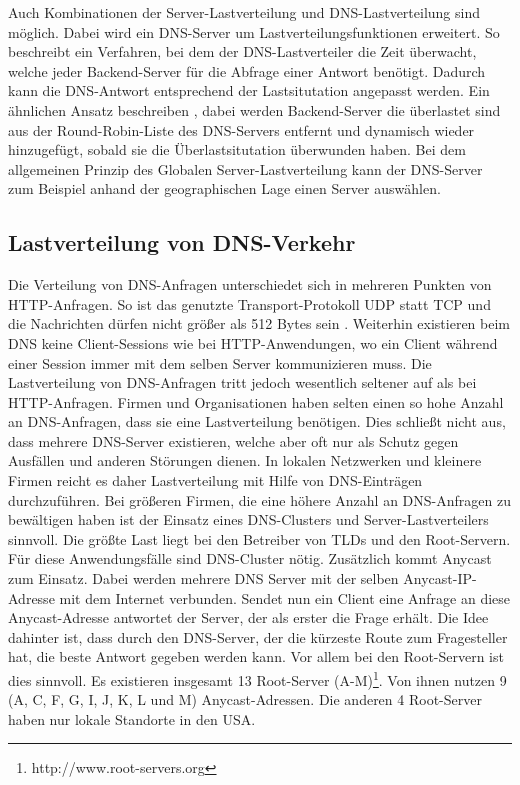 \documentclass[a4paper, 12pt, BCOR10mm, DIV12, toc=bibliography, toc=listof, german]{scrbook}
\begin{document}
			Auch Kombinationen der Server-Lastverteilung und DNS-Lastverteilung sind möglich. Dabei wird ein
			DNS-Server um Lastverteilungsfunktionen erweitert. So beschreibt \cite{chyuyi2003} ein
			Verfahren, bei dem der DNS-Lastverteiler die Zeit überwacht, welche jeder Backend-Server für
			die Abfrage einer Antwort benötigt. Dadurch kann die DNS-Antwort entsprechend der
			Lastsitutation angepasst werden. Ein ähnlichen Ansatz beschreiben \cite{mookim2005}, dabei
			werden Backend-Server die überlastet sind aus der Round-Robin-Liste des DNS-Servers entfernt
			und dynamisch wieder hinzugefügt, sobald sie die Überlastsitutation überwunden haben. Bei dem
			allgemeinen Prinzip des Globalen Server-Lastverteilung \cite{bourke2001} kann der DNS-Server
			zum Beispiel anhand der geographischen Lage einen Server auswählen.

			
			\subsection*{Lastverteilung von DNS-Verkehr} %

			Die Verteilung von DNS-Anfragen unterschiedet sich in mehreren Punkten von HTTP-Anfragen. So
			ist das genutzte Transport-Protokoll UDP statt TCP und die Nachrichten dürfen nicht größer als
			512 Bytes sein \cite{rfc1035}. Weiterhin existieren beim DNS keine Client-Sessions wie bei
			HTTP-Anwendungen, wo ein Client während einer Session immer mit dem selben Server
			kommunizieren muss. Die Lastverteilung von DNS-Anfragen tritt jedoch wesentlich seltener auf
			als bei HTTP-Anfragen. Firmen und Organisationen haben selten einen so hohe Anzahl an
			DNS-Anfragen, dass sie eine Lastverteilung benötigen. Dies schließt nicht aus, dass mehrere
			DNS-Server existieren, welche aber oft nur als Schutz gegen Ausfällen und anderen Störungen
			dienen.  In lokalen Netzwerken und kleinere Firmen reicht es daher Lastverteilung mit Hilfe
			von DNS-Einträgen durchzuführen. Bei größeren Firmen, die eine höhere Anzahl an DNS-Anfragen
			zu bewältigen haben ist der Einsatz eines DNS-Clusters und Server-Lastverteilers sinnvoll. Die
			größte Last liegt bei den Betreiber von TLDs und den Root-Servern. Für diese Anwendungsfälle
			sind DNS-Cluster nötig. Zusätzlich kommt Anycast \cite{rfc4786} zum Einsatz. Dabei werden mehrere DNS Server
			mit der selben Anycast-IP-Adresse mit dem Internet verbunden. Sendet nun ein
			Client eine Anfrage an diese Anycast-Adresse antwortet der Server, der als erster die Frage
			erhält. Die Idee dahinter ist, dass durch den DNS-Server, der die kürzeste Route zum
			Fragesteller hat, die beste Antwort gegeben werden kann. Vor allem bei den Root-Servern ist
			dies sinnvoll. Es existieren insgesamt 13 Root-Server
			(A-M)\footnote{http://www.root-servers.org}. Von ihnen nutzen 9 (A, C, F, G, I, J, K, L und M)
			Anycast-Adressen. Die anderen 4 Root-Server haben nur lokale Standorte in den USA. 
				
\end{document}
